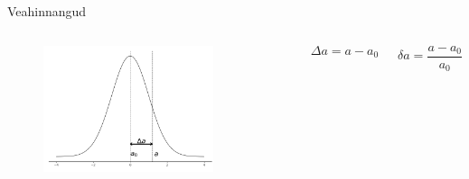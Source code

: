 \documentclass{beamer}
\begin{document}
\begin{frame}{Veahinnangud}
    \begin{columns}
        \begin{figure}[H]
            \includegraphics[width=0.8\textwidth]{absoluutne_viga.png}
        \end{figure}

        \begin{equation*}
            \Delta a = a - a_0
        \end{equation*}

        \begin{equation*}
            \delta a = \frac{a - a_0}{a_0}
        \end{equation*}
    \end{columns}
\end{frame}

% 
% 
\end{document}
